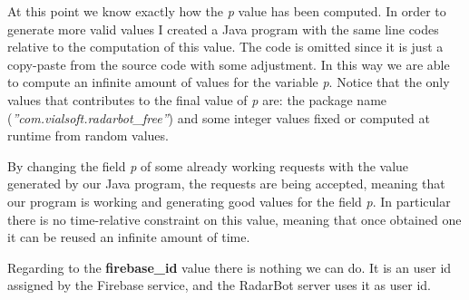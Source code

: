 			\par At this point we know exactly how the \textit{p} value has been computed. In order to generate more valid values I created a Java program with the same line codes relative to the computation of this value. The code is omitted since it is just a copy-paste from the source code with some adjustment. In this way we are able to compute an infinite amount of values for the variable \textit{p}.   \newline
			Notice that the only values that contributes to the final value of \textit{p} are: the package name (\textit{''com.vialsoft.radarbot\_free''}) and some integer values fixed or computed at runtime from random values. \newline
			\par By changing the field \textit{p} of some already working requests with the value generated by our Java program, the requests are being accepted, meaning that our program is working and generating good values for the field \textit{p}. In particular there is no time-relative constraint on this value, meaning that once obtained one it can be reused an infinite amount of time. \newline
			\par Regarding to the \textbf{firebase\_id} value there is nothing we can do. It is an user id assigned by the Firebase service, and the RadarBot server uses it as user id. 
			
